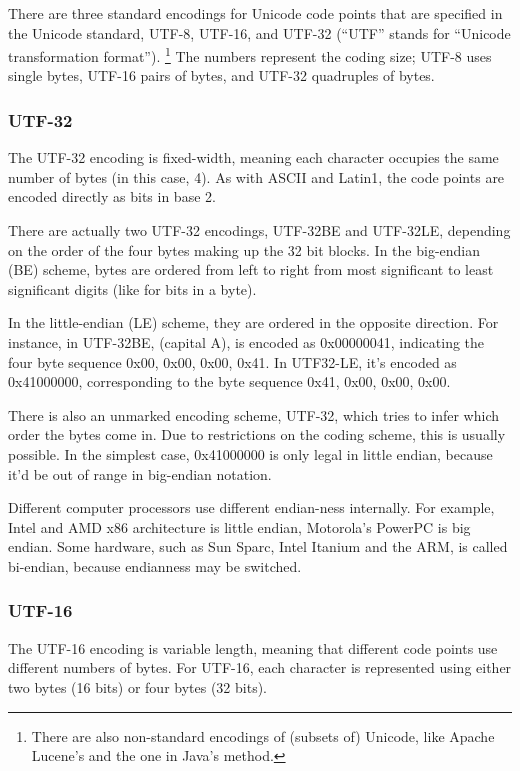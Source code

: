 There are three standard encodings for Unicode code points that are
specified in the Unicode standard, UTF-8, UTF-16, and UTF-32 (``UTF''
stands for ``Unicode transformation format'').%
%
\footnote{There are also non-standard encodings of (subsets of) 
Unicode, like Apache Lucene's and the one in Java's
 method.}
%
The numbers represent the coding size; UTF-8 uses single bytes,
UTF-16 pairs of bytes, and UTF-32 quadruples of bytes.

\subsubsection{UTF-32}

The UTF-32 encoding is fixed-width, meaning each character occupies
the same number of bytes (in this case, 4).  As with ASCII and
Latin1, the code points are encoded directly as bits in base 2.

There are actually two UTF-32 encodings, UTF-32BE and UTF-32LE,
depending on the order of the four bytes making up the 32 bit blocks.
In the big-endian (BE) scheme, bytes are ordered from left to right
from most significant to least significant digits (like for bits in a
byte).  

In the little-endian (LE) scheme, they are ordered in the
opposite direction.  For instance, in UTF-32BE, 
(capital A), is encoded as 0x00000041, indicating the four byte
sequence 0x00, 0x00, 0x00, 0x41.  In UTF32-LE, it's encoded as
0x41000000, corresponding to the byte sequence 0x41, 0x00, 0x00, 0x00.

There is also an unmarked encoding scheme, UTF-32, which tries to
infer which order the bytes come in.  Due to restrictions on the
coding scheme, this is usually possible.  In the simplest case,
0x41000000 is only legal in little endian, because it'd be out of
range in big-endian notation.  

Different computer processors use different endian-ness
internally.  For example, Intel and AMD x86 architecture is little
endian, Motorola's PowerPC is big endian.  Some hardware, such
as Sun Sparc, Intel Itanium and the ARM, is called bi-endian, because
endianness may be switched.

\subsubsection{UTF-16}\label{section:utf-16}

The UTF-16 encoding is variable length, meaning that different code
points use different numbers of bytes.  For UTF-16, each character is
represented using either two bytes (16 bits) or four bytes (32 bits).

